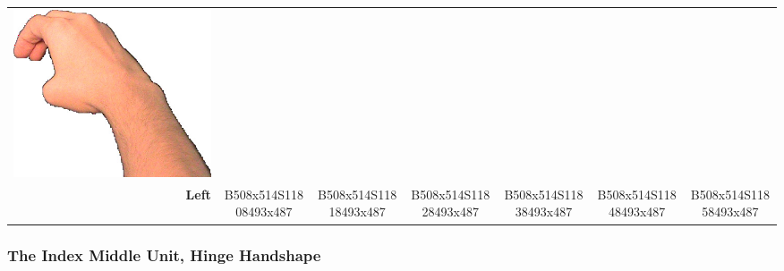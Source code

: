 \documentclass{article}
\begin{document}
\begin{center}
\begin{tabular}{r*{6}{c}}
\includegraphics[scale=0.1]{images/02-04-6.jpg}\\
\textbf{Left}&
B508x514S11808493x487&
B508x514S11818493x487&
B508x514S11828493x487&
B508x514S11838493x487&
B508x514S11848493x487&
B508x514S11858493x487\\
\end{tabular}
\end{center}

\subsubsection{The Index Middle Unit, Hinge Handshape}
\end{document}
